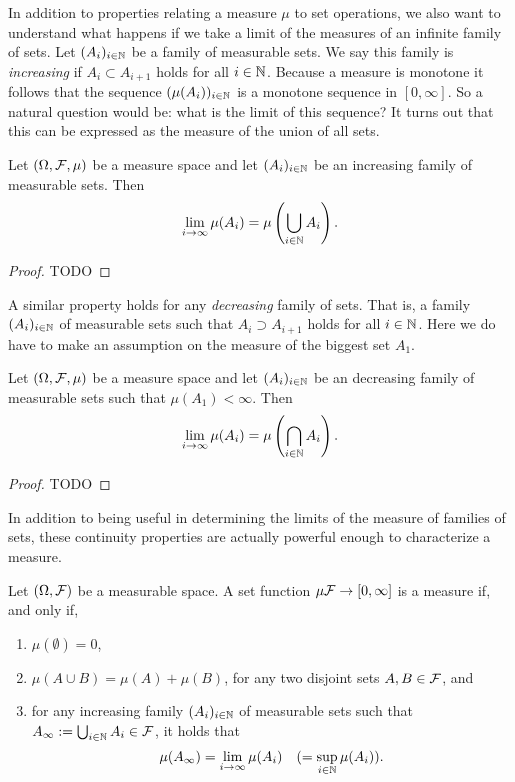In addition to properties relating a measure $\mu$ to set operations, we also want to understand what happens if we take a limit of the measures of an infinite family of sets. Let $(A_i)_{i \in \mathbb N}$ be a family of measurable sets. We say this family is \emph{increasing} if $A_i \subset A_{i+1}$ holds for all $i \in \mathbb N$. Because a measure is monotone it follows that the sequence $(\mu(A_i))_{i \in \mathbb N}$ is a monotone sequence in $[0,\infty]$. So a natural question would be: what is the limit of this sequence? It turns out that this can be expressed as the measure of the union of all sets.

\begin{proposition}
Let $(\Omega, \mathcal F, \mu)$ be a measure space and let $(A_i)_{i \in \mathbb N}$ be an increasing family of measurable sets. Then
\[
	\lim_{i \to \infty} \mu(A_i) = \mu\left(\bigcup_{i \in \mathbb N} A_i\right).
\]
\end{proposition}

\begin{proof}
TODO
\end{proof}

A similar property holds for any \emph{decreasing} family of sets. That is, a family $(A_i)_{i \in \mathbb N}$ of measurable sets such that $A_i \supset A_{i+1}$ holds for all $i \in \mathbb N$. Here we do have to make an assumption on the measure of the biggest set $A_1$.

\begin{proposition}
Let $(\Omega, \mathcal F, \mu)$ be a measure space and let $(A_i)_{i \in \mathbb N}$ be an decreasing family of measurable sets such that $\mu(A_1) < \infty$. Then
\[
	\lim_{i \to \infty} \mu(A_i) = \mu\left(\bigcap_{i \in \mathbb N} A_i\right).
\]
\end{proposition}

\begin{proof}
TODO
\end{proof}

In addition to being useful in determining the limits of the measure of families of sets, these continuity properties are actually powerful enough to characterize a measure. 

\begin{theorem}
Let $(\Omega, \mathcal F)$ be a measurable space. A set function $\mu \mathcal F \to [0,\infty]$ is a measure if, and only if,
\begin{enumerate}
\item $\mu(\emptyset) = 0$,
\item $\mu(A \cup B) = \mu(A) + \mu(B)$, for any two disjoint sets $A, B \in \mathcal F$, and
\item for any increasing family $(A_i)_{i \in \mathbb N}$ of measurable sets such that $A_\infty := \bigcup_{i \in \mathbb N} A_i \in \mathcal F$, it holds that
\[
	\mu(A_\infty) = \lim_{i \to \infty} \mu(A_i) \quad (= \sup_{i \in \mathbb N} \mu(A_i)).
\]
\end{enumerate}
\end{theorem}

